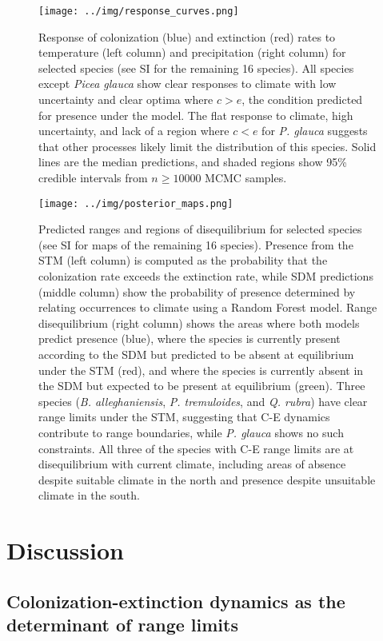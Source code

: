 \documentclass[11pt]{article}
\begin{document}
\begin{figure}
\texttt{[image: ../img/response\_curves.png]}
\caption{
	Response of colonization (blue) and extinction (red) rates to temperature (left column) and precipitation (right column) for selected species (see SI for the remaining 16 species).
	All species except \emph{Picea glauca} show clear responses to climate with low uncertainty and clear optima where $c > e$, the condition predicted for presence under the model.
	The flat response to climate, high uncertainty, and lack of a region where $c < e$ for \emph{P. glauca} suggests that other processes likely limit the distribution of this species.
	Solid lines are the median predictions, and shaded regions show 95\% credible intervals from $n \ge 10000$ MCMC samples.
}
\label{fig:response_curves}
\end{figure}


\begin{figure}
\texttt{[image: ../img/posterior\_maps.png]}
\caption{
	Predicted ranges and regions of disequilibrium for selected species (see SI for maps of the remaining 16 species).
	Presence from the STM (left column) is computed as the probability that the colonization rate exceeds the extinction rate, while SDM predictions (middle column) show the probability of presence determined by relating occurrences to climate using a Random Forest model.
	Range disequilibrium (right column) shows the areas where both models predict presence (blue), where the species is currently present according to the SDM but predicted to be absent at equilibrium under the STM (red), and where the species is currently absent in the SDM but expected to be present at equilibrium (green).
	Three species (\emph{B. alleghaniensis}, \emph{P. tremuloides}, and \emph{Q. rubra}) have clear range limits under the STM, suggesting that C-E dynamics contribute to range boundaries, while \emph{P. glauca} shows no such constraints.
	All three of the species with C-E range limits are at disequilibrium with current climate, including areas of absence despite suitable climate in the north and presence despite unsuitable climate in the south.
}
\label{fig:maps}
\end{figure}


\section*{Discussion}

\subsection*{Colonization-extinction dynamics as the determinant of range limits}
\end{document}
